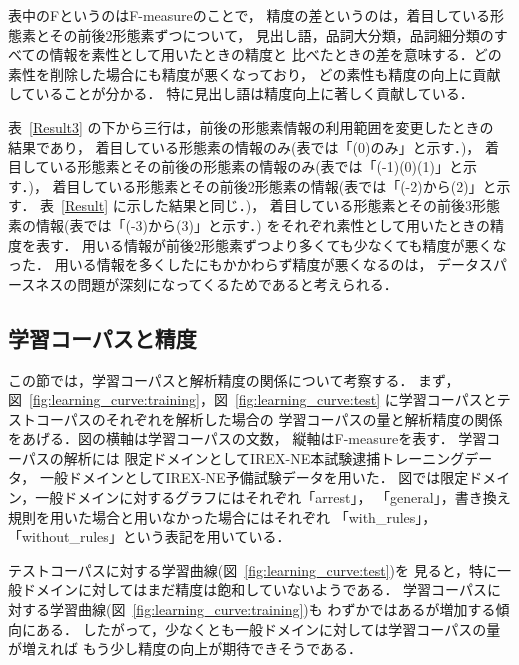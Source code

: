 表中のFというのはF-measureのことで，
精度の差というのは，着目している形態素とその前後2形態素ずつについて，
見出し語，品詞大分類，品詞細分類のすべての情報を素性として用いたときの精度と
比べたときの差を意味する．どの素性を削除した場合にも精度が悪くなっており，
どの素性も精度の向上に貢献していることが分かる．
特に見出し語は精度向上に著しく貢献している．

表~\ref{Result3} の下から三行は，前後の形態素情報の利用範囲を変更したときの
結果であり，
着目している形態素の情報のみ(表では「(0)のみ」と示す．)，
着目している形態素とその前後の形態素の情報のみ(表では「(-1)(0)(1)」と示す．)，
着目している形態素とその前後2形態素の情報(表では「(-2)から(2)」と示す．
表~\ref{Result} に示した結果と同じ．)，
着目している形態素とその前後3形態素の情報(表では「(-3)から(3)」と示す．)
をそれぞれ素性として用いたときの精度を表す．
用いる情報が前後2形態素ずつより多くても少なくても精度が悪くなった．
用いる情報を多くしたにもかかわらず精度が悪くなるのは，
データスパースネスの問題が深刻になってくるためであると考えられる．

\subsection{学習コーパスと精度}
\label{sec:training_corpus_and_accuracy}

この節では，学習コーパスと解析精度の関係について考察する．
まず，図~\ref{fig:learning_curve:training}，図~\ref{fig:learning_curve:test}
に学習コーパスとテストコーパスのそれぞれを解析した場合の
学習コーパスの量と解析精度の関係をあげる．図の横軸は学習コーパスの文数，
縦軸はF-measureを表す．
学習コーパスの解析には
限定ドメインとしてIREX-NE本試験逮捕トレーニングデータ，
一般ドメインとしてIREX-NE予備試験データを用いた．
図では限定ドメイン，一般ドメインに対するグラフにはそれぞれ「arrest」，
「general」，書き換え規則を用いた場合と用いなかった場合にはそれぞれ
「with\_rules」，「without\_rules」という表記を用いている．

テストコーパスに対する学習曲線(図~\ref{fig:learning_curve:test})を
見ると，特に一般ドメインに対してはまだ精度は飽和していないようである．
学習コーパスに対する学習曲線(図~\ref{fig:learning_curve:training})も
わずかではあるが増加する傾向にある．
したがって，少なくとも一般ドメインに対しては学習コーパスの量が増えれば
もう少し精度の向上が期待できそうである．

\begin{figure*}[htbp]
  \begin{center}
    \leavevmode
    \caption{学習コーパスの量と精度の関係(学習コーパスに対して)}
    \label{fig:learning_curve:training}
  \end{center}

  \begin{center}
    \leavevmode
    \caption{学習コーパスの量と精度の関係(テストコーパスに対して)}
    \label{fig:learning_curve:test}
  \end{center}
\end{figure*}


